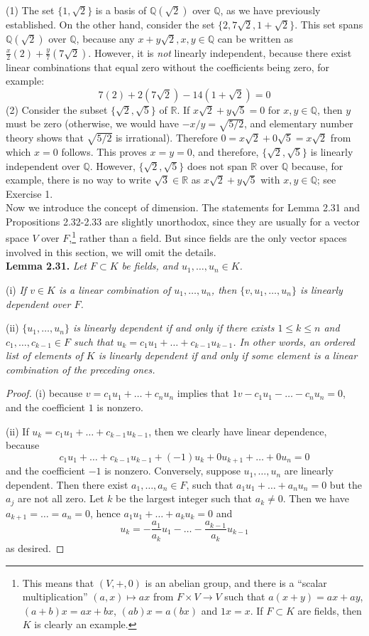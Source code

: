 \documentclass[leqno]{book}
\begin{document}
(1) The set $\{1,\sqrt 2\}$ is a basis of $\mathbb Q(\sqrt 2)$ over $\mathbb Q$, as we have previously established.  On the other hand, consider the set $\{2,7\sqrt 2,1+\sqrt 2\}$.  This set spans $\mathbb Q(\sqrt 2)$ over $\mathbb Q$, because any $x+y\sqrt 2,x,y\in\mathbb Q$ can be written as $\frac x2(2)+\frac y7(7\sqrt 2)$.  However, it is \emph{not} linearly independent, because there exist linear combinations that equal zero without the coefficients being zero, for example:
$$7(2)+2(7\sqrt 2)-14(1+\sqrt 2)=0$$
(2) Consider the subset $\{\sqrt 2,\sqrt 5\}$ of $\mathbb R$.  If $x\sqrt 2+y\sqrt 5=0$ for $x,y\in\mathbb Q$, then $y$ must be zero (otherwise, we would have $-x/y=\sqrt{5/2}$, and elementary number theory shows that $\sqrt{5/2}$ is irrational).  Therefore $0=x\sqrt 2+0\sqrt 5=x\sqrt 2$ from which $x=0$ follows.  This proves $x=y=0$, and therefore, $\{\sqrt 2,\sqrt 5\}$ is linearly independent over $\mathbb Q$.  However, $\{\sqrt 2,\sqrt 5\}$ does not span $\mathbb R$ over $\mathbb Q$ because, for example, there is no way to write $\sqrt 3\in\mathbb R$ as $x\sqrt 2+y\sqrt 5$ with $x,y\in\mathbb Q$; see Exercise 1.\\

\noindent Now we introduce the concept of dimension.  The statements for Lemma 2.31 and Propositions 2.32-2.33 are slightly unorthodox, since they are usually for a vector space $V$ over $F$,\footnote{This means that $(V,+,0)$ is an abelian group, and there is a ``scalar multiplication'' $(a,x)\mapsto ax$ from $F\times V\to V$ such that $a(x+y)=ax+ay$, $(a+b)x=ax+bx$, $(ab)x=a(bx)$ and $1x=x$.  If $F\subset K$ are fields, then $K$ is clearly an example.} rather than a field.  But since fields are the only vector spaces involved in this section, we will omit the details.\\

\noindent\textbf{Lemma 2.31.} \emph{Let $F\subset K$ be fields, and $u_1,\dots,u_n\in K$.}

(i) \emph{If $v\in K$ is a linear combination of $u_1,\dots,u_n$, then $\{v,u_1,\dots,u_n\}$ is linearly dependent over $F$.}

(ii) \emph{$\{u_1,\dots,u_n\}$ is linearly dependent if and only if there exists $1\leqslant k\leqslant n$ and $c_1,\dots,c_{k-1}\in F$ such that $u_k=c_1u_1+\dots+c_{k-1}u_{k-1}$.  In other words, an ordered list of elements of $K$ is linearly dependent if and only if some element is a linear combination of the preceding ones.}
\begin{proof}
(i) because $v=c_1u_1+\dots+c_nu_n$ implies that $1v-c_1u_1-\dots-c_nu_n=0$, and the coefficient $1$ is nonzero.

(ii) If $u_k=c_1u_1+\dots+c_{k-1}u_{k-1}$, then we clearly have linear dependence, because
$$c_1u_1+\dots+c_{k-1}u_{k-1}+(-1)u_k+0u_{k+1}+\dots+0u_n=0$$
and the coefficient $-1$ is nonzero.  Conversely, suppose $u_1,\dots,u_n$ are linearly dependent.  Then there exist $a_1,\dots,a_n\in F$, such that $a_1u_1+\dots+a_nu_n=0$ but the $a_j$ are not all zero.  Let $k$ be the largest integer such that $a_k\ne 0$.  Then we have $a_{k+1}=\dots=a_n=0$, hence $a_1u_1+\dots+a_ku_k=0$ and
$$u_k=-\frac{a_1}{a_k}u_1-\dots-\frac{a_{k-1}}{a_k}u_{k-1}$$
as desired.
\end{proof}
\end{document}
